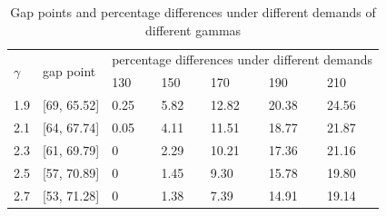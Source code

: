 \begin{table}[ht]
  \centering
  \caption{Gap points and percentage differences under different demands of different gammas}
\begin{tabular}{lllllll}
  \hline
  \multicolumn{1}{|l|}{\multirow{2}{*}{$\gamma$}} & \multicolumn{1}{l|}{\multirow{2}{*}{gap point}} & \multicolumn{5}{l|}{percentage differences under different demands}   \\ 
  \cline{3-7} 
  \multicolumn{1}{|l|}{}                      & \multicolumn{1}{l|}{}                    & \multicolumn{1}{l|}{130} & \multicolumn{1}{l|}{150} & \multicolumn{1}{l|}{170} & \multicolumn{1}{l|}{190} & \multicolumn{1}{l|}{210} \\ 
  \hline
  \multicolumn{1}{|l|}{1.9}  & \multicolumn{1}{l|}{[69, 65.52]}  & \multicolumn{1}{l|}{0.25}  & \multicolumn{1}{l|}{5.82}  & \multicolumn{1}{l|}{12.82} & \multicolumn{1}{l|}{20.38} & \multicolumn{1}{l|}{24.56} \\ 
  \hline                                    
  \multicolumn{1}{|l|}{2.1}  & \multicolumn{1}{l|}{[64, 67.74]}  & \multicolumn{1}{l|}{0.05}  & \multicolumn{1}{l|}{4.11}  & \multicolumn{1}{l|}{11.51} & \multicolumn{1}{l|}{18.77} & \multicolumn{1}{l|}{21.87} \\ 
  \hline           
  \multicolumn{1}{|l|}{2.3}  & \multicolumn{1}{l|}{[61, 69.79]}  & \multicolumn{1}{l|}{0}  & \multicolumn{1}{l|}{2.29}  & \multicolumn{1}{l|}{10.21} & \multicolumn{1}{l|}{17.36} & \multicolumn{1}{l|}{21.16} \\ 
  \hline           
  \multicolumn{1}{|l|}{2.5}  & \multicolumn{1}{l|}{[57, 70.89]}  & \multicolumn{1}{l|}{0}  & \multicolumn{1}{l|}{1.45}  & \multicolumn{1}{l|}{9.30} & \multicolumn{1}{l|}{15.78} & \multicolumn{1}{l|}{19.80} \\ 
  \hline          
  \multicolumn{1}{|l|}{2.7}  & \multicolumn{1}{l|}{[53, 71.28]}  & \multicolumn{1}{l|}{0}  & \multicolumn{1}{l|}{1.38}  & \multicolumn{1}{l|}{7.39} & \multicolumn{1}{l|}{14.91} & \multicolumn{1}{l|}{19.14} \\ 
  \hline            
\end{tabular}
\end{table}





